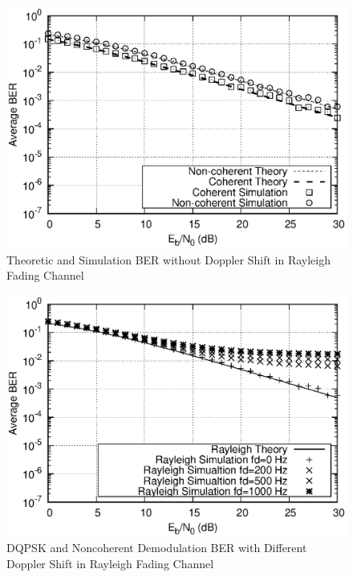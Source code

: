 \documentclass[technicalreport]{ieicej}
\begin{document}
\begin{figure}[H]
	\begin{center}
		\vspace{0cm}
		\includegraphics[width=\linewidth,clip]{fig/without_fd.eps}
		\caption{Theoretic and Simulation BER without Doppler Shift in Rayleigh Fading Channel}
		\label{fig:sample}
	\end{center}
\end{figure}

\begin{figure}[H]
	\begin{center}
		\vspace{0cm}
		\includegraphics[width=\linewidth,clip]{fig/with_fd.eps}
		\caption{DQPSK and Noncoherent Demodulation BER with Different Doppler Shift in Rayleigh Fading Channel}
		\label{fig:sample}
	\end{center}
\end{figure}
\end{document}
